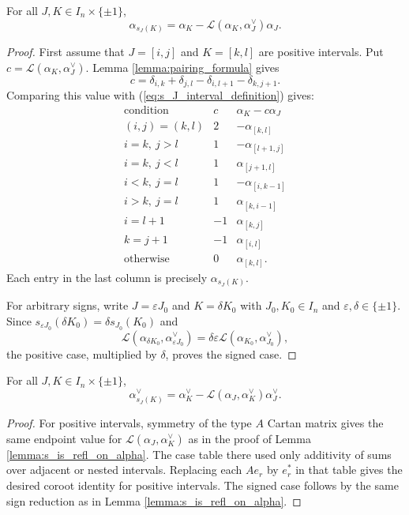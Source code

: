 \begin{lemma}\label{lemma:s_is_refl_on_alpha}
\leanok
For all $J,K\in I_n\times\{\pm1\}$,
\[
    \alpha_{s_J(K)}
    =
    \alpha_K-\mathcal{L}(\alpha_K,\alpha_J^\vee)\alpha_J.
\]
\end{lemma}
\begin{proof}
First assume that $J=[i,j]$ and $K=[k,l]$ are positive intervals. Put
$c=\mathcal{L}(\alpha_K,\alpha_J^\vee)$. Lemma
\ref{lemma:pairing_formula} gives
\[
    c=
    \delta_{i,k}
    +\delta_{j,l}
    -\delta_{i,l+1}
    -\delta_{k,j+1}.
\]
Comparing this value with (\ref{eq:s_J_interval_definition}) gives:
\[
\begin{array}{c|c|c}
\text{condition} & c & \alpha_K-c\alpha_J \\ \hline
(i,j)=(k,l) & 2 & -\alpha_{[k,l]}\\
i=k,\ j>l & 1 & -\alpha_{[l+1,j]}\\
i=k,\ j<l & 1 & \alpha_{[j+1,l]}\\
i<k,\ j=l & 1 & -\alpha_{[i,k-1]}\\
i>k,\ j=l & 1 & \alpha_{[k,i-1]}\\
i=l+1 & -1 & \alpha_{[k,j]}\\
k=j+1 & -1 & \alpha_{[i,l]}\\
\text{otherwise} & 0 & \alpha_{[k,l]}.
\end{array}
\]
Each entry in the last column is precisely $\alpha_{s_J(K)}$.

For arbitrary signs, write $J=\varepsilon J_0$ and $K=\delta K_0$ with
$J_0,K_0\in I_n$ and $\varepsilon,\delta\in\{\pm1\}$. Since
$s_{\varepsilon J_0}(\delta K_0)=\delta s_{J_0}(K_0)$ and
\[
    \mathcal{L}(\alpha_{\delta K_0},\alpha_{\varepsilon J_0}^\vee)
    =
    \delta\varepsilon
    \mathcal{L}(\alpha_{K_0},\alpha_{J_0}^\vee),
\]
the positive case, multiplied by $\delta$, proves the signed case.
\end{proof}

\begin{lemma}\label{lemma:s_is_refl_on_alpha_dual}
\leanok
For all $J,K\in I_n\times\{\pm1\}$,
\[
    \alpha_{s_J(K)}^\vee
    =
    \alpha_K^\vee-\mathcal{L}(\alpha_J,\alpha_K^\vee)\alpha_J^\vee.
\]
\end{lemma}
\begin{proof}
    \leanok
For positive intervals, symmetry of the type $A$ Cartan matrix gives the
same endpoint value for $\mathcal{L}(\alpha_J,\alpha_K^\vee)$ as in the
proof of Lemma \ref{lemma:s_is_refl_on_alpha}. The case table there used
only additivity of sums over adjacent or nested intervals. Replacing each
$Ae_r$ by $e_r^*$ in that table gives the desired coroot identity for
positive intervals. The signed case follows by the same sign reduction as
in Lemma \ref{lemma:s_is_refl_on_alpha}.
\end{proof}

